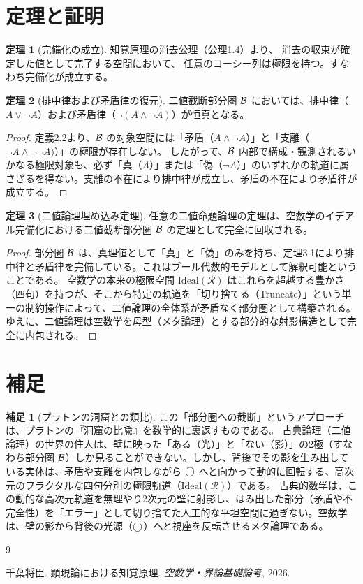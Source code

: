 \documentclass[11pt,a4paper]{article}
\newcommand{\ideal}[1]{\mathrm{Ideal}(#1)}
\newcommand{\Rep}{\mathcal{R}}
\theoremstyle{definition}
\newtheorem{theorem}{定理}[section]
\newtheorem{scholium}{補足}[section]
\begin{document}
\section{定理と証明}

\begin{theorem}[完備化の成立]
知覚原理\cite{Chiba2026_chikaku}の消去公理（公理1.4）より、
消去の収束が確定した値として完了する空間において、
任意のコーシー列は極限を持つ。すなわち完備化が成立する。
\end{theorem}

\begin{theorem}[排中律および矛盾律の復元]
二値截断部分圏 $\mathcal{B}$ においては、排中律（$A \lor \neg A$）および矛盾律（$\neg(A \land \neg A)$）が恒真となる。
\end{theorem}

\begin{proof}
定義2.2より、$\mathcal{B}$ の対象空間には「矛盾（$A \land \neg A$）」と「支離（$\neg A \land \neg \neg A)$）」の極限が存在しない。
したがって、$\mathcal{B}$ 内部で構成・観測されるいかなる極限対象も、必ず「真（$A$）」または「偽（$\neg A$）」のいずれかの軌道に属さざるを得ない。支離の不在により排中律が成立し、矛盾の不在により矛盾律が成立する。
\end{proof}

\begin{theorem}[二値論理埋め込み定理]
任意の二値命題論理の定理は、空数学のイデアル完備化における二値截断部分圏 $\mathcal{B}$ の定理として完全に回収される。
\end{theorem}

\begin{proof}
部分圏 $\mathcal{B}$ は、真理値として「真」と「偽」のみを持ち、定理3.1により排中律と矛盾律を完備している。これはブール代数的モデルとして解釈可能ということである。
空数学の本来の極限空間 $\ideal{\Rep}$ はこれらを超越する豊かさ（四句）を持つが、そこから特定の軌道を「切り捨てる（Truncate）」という単一の制約操作によって、二値論理の全体系が矛盾なく部分圏として構築される。
ゆえに、二値論理は空数学を母型（メタ論理）とする部分的な射影構造として完全に内包される。
\end{proof}

\section{補足}

\begin{scholium}[プラトンの洞窟との類比]
この「部分圏への截断」というアプローチは、プラトンの『洞窟の比喩』を数学的に裏返すものである。
古典論理（二値論理）の世界の住人は、壁に映った「ある（光）」と「ない（影）」の2極（すなわち部分圏 $\mathcal{B}$）しか見ることができない。しかし、背後でその影を生み出している実体は、矛盾や支離を内包しながら $\bigcirc$ へと向かって動的に回転する、高次元のフラクタルな四句分別の極限軌道（$\ideal{\Rep}$）である。
古典的数学は、この動的な高次元軌道を無理やり2次元の壁に射影し、はみ出した部分（矛盾や不完全性）を「エラー」として切り捨てた人工的な平坦空間に過ぎない。空数学は、壁の影から背後の光源（$\bigcirc$）へと視座を反転させるメタ論理である。
\end{scholium}

\begin{thebibliography}{9}

千葉将臣.
\newblock 顕現論における知覚原理.
\newblock \emph{空数学・界論基礎論考}, 2026.

\end{thebibliography}
\end{document}
